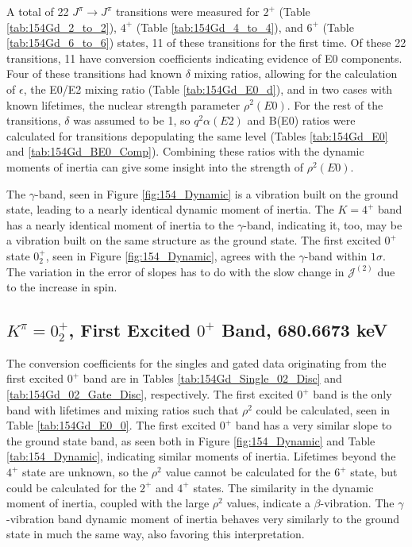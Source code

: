 A total of 22 $J^{\pi}\rightarrow J^{\pi}$ transitions were measured for $2^+$ (Table \ref{tab:154Gd_2_to_2}), $4^+$ (Table \ref{tab:154Gd_4_to_4}), and $6^+$ (Table \ref{tab:154Gd_6_to_6}) states, 11 of these transitions for the first time. Of these 22 transitions, 11 have conversion coefficients indicating evidence of E0 components. Four of these transitions had known $\delta$ mixing ratios, allowing for the calculation of $\epsilon$, the E0/E2 mixing ratio (Table \ref{tab:154Gd_E0_d}), and in two cases with known lifetimes, the nuclear strength parameter $\rho^2(E0)$. For the rest of the transitions, $\delta$ was assumed to be 1, so $q^2\alpha(E2)$ and B(E0) ratios were calculated for transitions depopulating the same level (Tables \ref{tab:154Gd_E0} and \ref{tab:154Gd_BE0_Comp}). Combining these ratios with the dynamic moments of inertia can give some insight into the strength of $\rho^2(E0)$.



%



The $\gamma$-band, seen in Figure \ref{fig:154_Dynamic} is a vibration built on the ground state, leading to a nearly identical dynamic moment of inertia. The $K=4^+$ band has a nearly identical moment of inertia to the $\gamma$-band, indicating it, too, may be a vibration built on the same structure as the ground state. The first excited $0^+$ state $0^+_2$, seen in Figure \ref{fig:154_Dynamic}, agrees with the $\gamma$-band within $1\sigma$. The variation in the error of slopes has to do with the slow change in $\mathcal{J}^{(2)}$ due to the increase in spin. 

\subsection{$K^{\pi}=0^+_2$, First Excited $0^+$ Band, 680.6673 keV}

The conversion coefficients for the singles and gated data originating from the first excited $0^+$ band are in Tables \ref{tab:154Gd_Single_02_Disc} and \ref{tab:154Gd_02_Gate_Disc}, respectively. The first excited $0^+$ band is the only band with lifetimes and mixing ratios such that $\rho^2$ could be calculated, seen in Table \ref{tab:154Gd_E0_0}. The first excited $0^+$ band has a very similar slope to the ground state band, as seen both in Figure \ref{fig:154_Dynamic} and Table \ref{tab:154_Dynamic}, indicating similar moments of inertia. Lifetimes beyond the $4^+$ state are unknown, so the $\rho^2$ value cannot be calculated for the $6^+$ state, but could be calculated for the $2^+$ and $4^+$ states. The similarity in the dynamic moment of inertia, coupled with the large $\rho^2$ values, indicate a $\beta$-vibration. The $\gamma$-vibration band dynamic moment of inertia behaves very similarly to the ground state in much the same way, also favoring this interpretation. 

